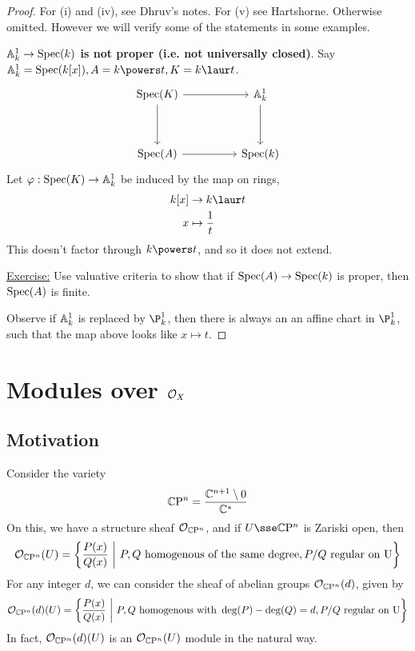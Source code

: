 \documentclass{article}
\begin{document}
\begin{proof}
    For (i) and (iv), see Dhruv's notes. For (v) see Hartshorne. Otherwise omitted. However we will verify some of the statements in some examples.

    \textbf{\(\mathbb{A}_{k}^{1} \to \operatorname{Spec}(k)\) is not proper (i.e. not universally closed)}. Say \(\aff k 1 = \Spec(k[x]), A = k \powers t, K = k\laur t\).
    \[\begin{tikzcd}
        {\Spec(K)} && {\aff k 1} \\
        \\
        {\Spec(A)} && {\Spec(k)}
        \arrow[from=1-1, to=3-1]
        \arrow[from=1-1, to=1-3]
        \arrow[from=1-3, to=3-3]
        \arrow[from=3-1, to=3-3]
    \end{tikzcd}\]
    Let \(\varphi : \operatorname{Spec}(K) \to \mathbb{A}_{k}^{1}\) be induced by the map on rings,
    \begin{align*}
        k[x] &\to k\laur t \\
        x &\mapsto \frac{1}{t}
    \end{align*}
    This doesn't factor through \(k\powers t\), and so it does not extend.

    \underline{Exercise:} Use valuative criteria to show that if \(\operatorname{Spec}(A) \to \operatorname{Spec}(k)\) is proper, then \(\operatorname{Spec}(A)\) is finite.

    Observe if \(\mathbb{A}_{k}^{1}\) is replaced by \(\P^1_k\), then there is always an an affine chart in \(\P^1_k\), such that the map above looks like \(x \mapsto t\).
\end{proof}

\section{Modules over \(\mathcal{O}_X\)}

\subsection{Motivation}

\begin{example}
     Consider the variety
    \[\mathbb{C} \mathrm{P}^n = \frac{\mathbb{C}^{n+1}\setminus 0}{\mathbb{C}^*}\]
    On this, we have a structure sheaf \(\mathcal{O}_{\mathbb{C} \mathrm{P}^n}\), and if \(U \sse \C \mathrm{P}^n\) is Zariski open, then
    \[\mathcal{O}_{\mathbb{C}\mathrm{P}^n}(U) = \left\{\frac{P(x)}{Q(x)} \ \bigg\vert\ P, Q \text{ homogenous of the same degree}, P/Q\text{ regular on U}\right\}\]
    For any integer \(d\), we can consider the sheaf of abelian groups \(\mathcal{O}_{\mathbb{C}\mathrm P^n}(d)\), given by
    \[\mathcal{O}_{\mathbb{C}\mathrm P^n}(d)(U) = \left\{\frac{P(x)}{Q(x)} \ \bigg\vert\ P, Q \text{ homogenous with }\deg(P) - \deg(Q) = d, P/Q \text{ regular on U}\right\}\]
    In fact, \(\mathcal{O}_{\mathbb{C}\mathrm P^n}(d)(U)\) is an \(\mathcal{O}_{\mathbb{C}\mathrm P^n}(U)\) module in the natural way.
\end{example}
\end{document}
